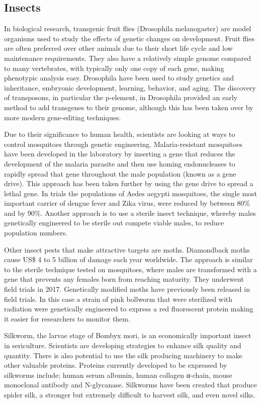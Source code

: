 \hypertarget{insects}{%
\subsection{Insects}\label{insects}}

In biological research, transgenic fruit flies (Drosophila melanogaster) are model organisms used to study the effects of genetic changes on development. Fruit flies are often preferred over other animals due to their short life cycle and low maintenance requirements. They also have a relatively simple genome compared to many vertebrates, with typically only one copy of each gene, making phenotypic analysis easy. Drosophila have been used to study genetics and inheritance, embryonic development, learning, behavior, and aging. The discovery of transposons, in particular the p-element, in Drosophila provided an early method to add transgenes to their genome, although this has been taken over by more modern gene-editing techniques.

Due to their significance to human health, scientists are looking at ways to control mosquitoes through genetic engineering. Malaria-resistant mosquitoes have been developed in the laboratory by inserting a gene that reduces the development of the malaria parasite and then use homing endonucleases to rapidly spread that gene throughout the male population (known as a gene drive). This approach has been taken further by using the gene drive to spread a lethal gene. In trials the populations of Aedes aegypti mosquitoes, the single most important carrier of dengue fever and Zika virus, were reduced by between 80\% and by 90\%. Another approach is to use a sterile insect technique, whereby males genetically engineered to be sterile out compete viable males, to reduce population numbers.

Other insect pests that make attractive targets are moths. Diamondback moths cause US\$ 4 to 5 billion of damage each year worldwide. The approach is similar to the sterile technique tested on mosquitoes, where males are transformed with a gene that prevents any females born from reaching maturity. They underwent field trials in 2017. Genetically modified moths have previously been released in field trials. In this case a strain of pink bollworm that were sterilized with radiation were genetically engineered to express a red fluorescent protein making it easier for researchers to monitor them.

Silkworm, the larvae stage of Bombyx mori, is an economically important insect in sericulture. Scientists are developing strategies to enhance silk quality and quantity. There is also potential to use the silk producing machinery to make other valuable proteins. Proteins currently developed to be expressed by silkworms include; human serum albumin, human collagen α-chain, mouse monoclonal antibody and N-glycanase. Silkworms have been created that produce spider silk, a stronger but extremely difficult to harvest silk, and even novel silks.

